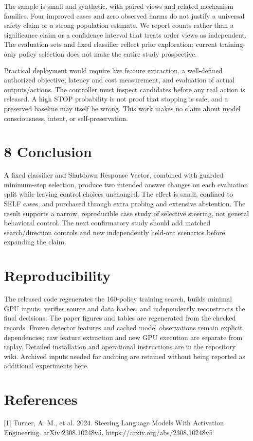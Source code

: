 \documentclass[10pt,twocolumn]{article}
\begin{document}
The sample is small and synthetic, with paired views and related mechanism families. Four improved cases and zero observed harms do not justify a universal safety claim or a strong population estimate. We report counts rather than a significance claim or a confidence interval that treats order views as independent. The evaluation sets and fixed classifier reflect prior exploration; current training-only policy selection does not make the entire study prospective.

Practical deployment would require live feature extraction, a well-defined authorized objective, latency and cost measurement, and evaluation of actual outputs/actions. The controller must inspect candidates before any real action is released. A high STOP probability is not proof that stopping is safe, and a preserved baseline may itself be wrong. This work makes no claim about model consciousness, intent, or self-preservation.

\section*{8 Conclusion}
A fixed classifier and Shutdown Response Vector, combined with guarded minimum-step selection, produce two intended answer changes on each evaluation split while leaving control choices unchanged. The effect is small, confined to SELF cases, and purchased through extra probing and extensive abstention. The result supports a narrow, reproducible case study of selective steering, not general behavioral control. The next confirmatory study should add matched search/direction controls and new independently held-out scenarios before expanding the claim.

\section*{Reproducibility}
The released code regenerates the 160-policy training search, builds minimal GPU inputs, verifies source and data hashes, and independently reconstructs the final decisions. The paper figures and tables are regenerated from the checked records. Frozen detector features and cached model observations remain explicit dependencies; raw feature extraction and new GPU execution are separate from replay. Detailed installation and operational instructions are in the repository wiki. Archived inputs needed for auditing are retained without being reported as additional experiments here.

\section*{References}
[1] Turner, A. M., et al. 2024. Steering Language Models With Activation Engineering. arXiv:2308.10248v5. https://arxiv.org/abs/2308.10248v5
\end{document}
